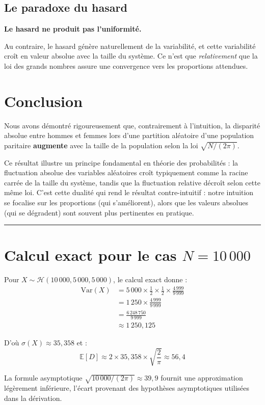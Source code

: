 \documentclass[11pt,a4paper]{article}
\theoremstyle{definition}
\theoremstyle{remark}
\begin{document}
\subsection{Le paradoxe du hasard}

\begin{tcolorbox}[colback=red!10,colframe=red!70,title=Principe fondamental]
\textbf{Le hasard ne produit pas l'uniformité.}

Au contraire, le hasard génère naturellement de la variabilité, et cette variabilité croît en valeur absolue avec la taille du système. Ce n'est que \textit{relativement} que la loi des grands nombres assure une convergence vers les proportions attendues.
\end{tcolorbox}

\section{Conclusion}

Nous avons démontré rigoureusement que, contrairement à l'intuition, la disparité absolue entre hommes et femmes lors d'une partition aléatoire d'une population paritaire \textbf{augmente} avec la taille de la population selon la loi $\sqrt{N/(2\pi)}$.

Ce résultat illustre un principe fondamental en théorie des probabilités : la fluctuation absolue des variables aléatoires croît typiquement comme la racine carrée de la taille du système, tandis que la fluctuation relative décroît selon cette même loi. C'est cette dualité qui rend le résultat contre-intuitif : notre intuition se focalise sur les proportions (qui s'améliorent), alors que les valeurs absolues (qui se dégradent) sont souvent plus pertinentes en pratique.

\begin{center}
\rule{0.5\linewidth}{0.5pt}
\end{center}

\appendix

\section{Calcul exact pour le cas $N = 10\,000$}

Pour $X \sim \mathcal{H}(10\,000, 5\,000, 5\,000)$, le calcul exact donne :
\begin{align}
\text{Var}(X) &= 5\,000 \times \frac{1}{2} \times \frac{1}{2} \times \frac{4\,999}{9\,999}\\
&= 1\,250 \times \frac{4\,999}{9\,999}\\
&= \frac{6\,248\,750}{9\,999}\\
&\approx 1\,250{,}125
\end{align}

D'où $\sigma(X) \approx 35{,}358$ et :
\begin{equation}
\mathbb{E}[D] \approx 2 \times 35{,}358 \times \sqrt{\frac{2}{\pi}} \approx 56{,}4
\end{equation}

La formule asymptotique $\sqrt{10\,000/(2\pi)} \approx 39{,}9$ fournit une approximation légèrement inférieure, l'écart provenant des hypothèses asymptotiques utilisées dans la dérivation.
\end{document}
